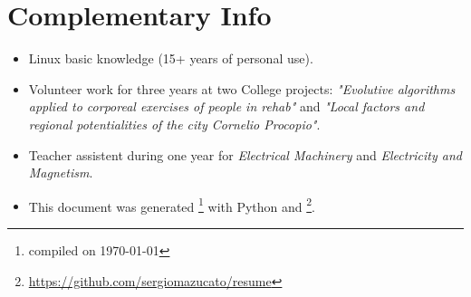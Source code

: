 \documentclass[]{friggeri-cv}
\begin{document}
\section{Complementary Info}

\begin{itemize}
	\item Linux basic knowledge (15+ years of personal use).
	\item Volunteer work for three years at two College projects: \textit{"Evolutive algorithms applied to corporeal exercises of people in rehab"} and \textit{"Local factors and regional potentialities of the city Cornelio Procopio"}.
	\item Teacher assistent during one year for \textit{Electrical Machinery} and \textit{Electricity and Magnetism}.
	\item This document was generated \footnote{compiled on \today} with Python and \myfont{\LaTeX} \footnote{\url{https://github.com/sergiomazucato/resume}}.\\
\end{itemize}



\end{document}

